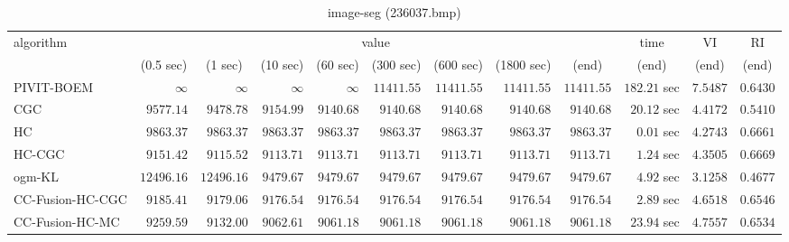 \begin{table}[H]
\scriptsize
\centering
\caption{image-seg (236037.bmp)}
\label{tab:anytimetable-image-seg-236037.bmp}
\begin{tabular}{lrrrrrrrrrrr}
\toprule
           algorithm &                                   \multicolumn{8}{c}{value} & \multicolumn{1}{c}{time}    & \multicolumn{1}{c}{VI}  & \multicolumn{1}{c}{RI} \\  
\cmidrule(lr){2-9}\cmidrule(lr){10-10} \cmidrule(lr){11-11} \cmidrule(lr){12-12}   
                     & \multicolumn{1}{c}{(0.5 sec)} & \multicolumn{1}{c}{(1 sec)} & \multicolumn{1}{c}{(10 sec)} & \multicolumn{1}{c}{(60 sec)} & \multicolumn{1}{c}{(300 sec)} & \multicolumn{1}{c}{(600 sec)} & \multicolumn{1}{c}{(1800 sec)} & \multicolumn{1}{c}{(end)} & \multicolumn{1}{c}{(end)}    & \multicolumn{1}{c}{(end)}   & \multicolumn{1}{c}{(end)}  \\ \midrule 
          PIVIT-BOEM & $\infty$ & $\infty$ & $\infty$ & $\infty$ & $     11411.55$ & $     11411.55$ & $     11411.55$ & $     11411.55$ & $       182.21$ sec    & $       7.5487$  & $       0.6430$ \\ 
                 CGC & $      9577.14$ & $      9478.78$ & $      9154.99$ & $      9140.68$ & $      9140.68$ & $      9140.68$ & $      9140.68$ & $      9140.68$ & $        20.12$ sec    & $       4.4172$  & $       0.5410$ \\ 
                  HC & $      9863.37$ & $      9863.37$ & $      9863.37$ & $      9863.37$ & $      9863.37$ & $      9863.37$ & $      9863.37$ & $      9863.37$ & $         0.01$ sec    & $       4.2743$  & $       0.6661$ \\ 
              HC-CGC & $      9151.42$ & $      9115.52$ & $      9113.71$ & $      9113.71$ & $      9113.71$ & $      9113.71$ & $      9113.71$ & $      9113.71$ & $         1.24$ sec    & $       4.3505$  & $       0.6669$ \\ 
              ogm-KL & $     12496.16$ & $     12496.16$ & $      9479.67$ & $      9479.67$ & $      9479.67$ & $      9479.67$ & $      9479.67$ & $      9479.67$ & $         4.92$ sec    & $       3.1258$  & $       0.4677$ \\ 
    CC-Fusion-HC-CGC & $      9185.41$ & $      9179.06$ & $      9176.54$ & $      9176.54$ & $      9176.54$ & $      9176.54$ & $      9176.54$ & $      9176.54$ & $         2.89$ sec    & $       4.6518$  & $       0.6546$ \\ 
     CC-Fusion-HC-MC & $      9259.59$ & $      9132.00$ & $      9062.61$ & $      9061.18$ & $      9061.18$ & $      9061.18$ & $      9061.18$ & $      9061.18$ & $        23.94$ sec    & $       4.7557$  & $       0.6534$ \\ 

\end{tabular}
\end{table}
